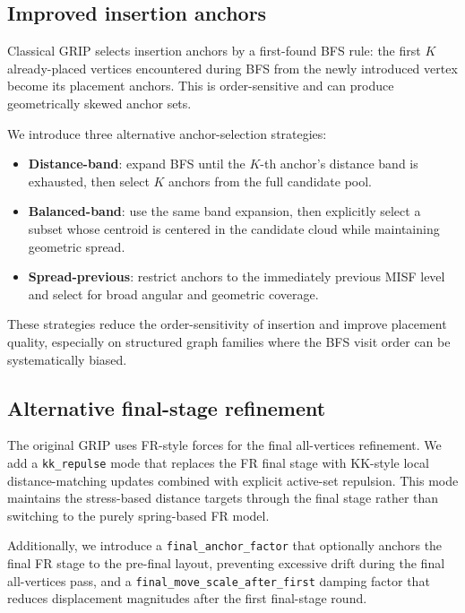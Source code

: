\documentclass[11pt,twocolumn]{article}
\begin{document}
\subsection{Improved insertion anchors}\label{sec:anchors}

Classical GRIP selects insertion anchors by a first-found BFS rule:
the first $K$ already-placed vertices encountered during BFS from the
newly introduced vertex become its placement anchors.  This is
order-sensitive and can produce geometrically skewed anchor sets.

We introduce three alternative anchor-selection strategies:

\begin{itemize}
\item \textbf{Distance-band}: expand BFS until the $K$-th anchor's
  distance band is exhausted, then select $K$ anchors from the full
  candidate pool.
\item \textbf{Balanced-band}: use the same band expansion, then
  explicitly select a subset whose centroid is centered in the candidate
  cloud while maintaining geometric spread.
\item \textbf{Spread-previous}: restrict anchors to the immediately
  previous MISF level and select for broad angular and geometric
  coverage.
\end{itemize}

These strategies reduce the order-sensitivity of insertion and improve
placement quality, especially on structured graph families where the BFS
visit order can be systematically biased.

\subsection{Alternative final-stage refinement}\label{sec:finalstage}

The original GRIP uses FR-style forces for the final all-vertices
refinement.  We add a \texttt{kk\_repulse} mode that replaces the FR
final stage with KK-style local distance-matching updates combined with
explicit active-set repulsion.  This mode maintains the stress-based
distance targets through the final stage rather than switching to the
purely spring-based FR model.

Additionally, we introduce a \texttt{final\_anchor\_factor} that
optionally anchors the final FR stage to the pre-final layout, preventing
excessive drift during the final all-vertices pass, and a
\texttt{final\_move\_scale\_after\_first} damping factor that reduces
displacement magnitudes after the first final-stage round.
\end{document}
